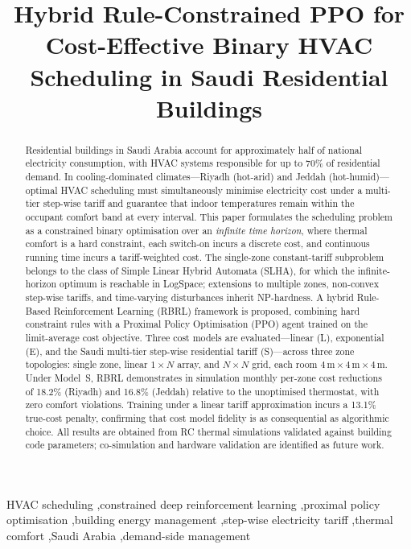 \documentclass[3p,number]{elsarticle}
\begin{document}
 
\begin{frontmatter}
 
\title{Hybrid Rule-Constrained PPO for Cost-Effective Binary HVAC Scheduling in Saudi Residential Buildings}
 
\begin{abstract}
Residential buildings in Saudi Arabia account for approximately half of national electricity consumption, with HVAC systems responsible for up to 70\% of residential demand.
In cooling-dominated climates---Riyadh (hot-arid) and Jeddah (hot-humid)---optimal HVAC scheduling must simultaneously minimise electricity cost under a multi-tier step-wise tariff and guarantee that indoor temperatures remain within the occupant comfort band at every interval.
This paper formulates the scheduling problem as a constrained binary optimisation over an \emph{infinite time horizon}, where thermal comfort is a hard constraint, each switch-on incurs a discrete cost, and continuous running time incurs a tariff-weighted cost.
The single-zone constant-tariff subproblem belongs to the class of Simple Linear Hybrid Automata (SLHA), for which the infinite-horizon optimum is reachable in LogSpace; extensions to multiple zones, non-convex step-wise tariffs, and time-varying disturbances inherit NP-hardness.
A hybrid Rule-Based Reinforcement Learning (RBRL) framework is proposed, combining hard constraint rules with a Proximal Policy Optimisation (PPO) agent trained on the limit-average cost objective.
Three cost models are evaluated---linear (L), exponential (E), and the Saudi multi-tier step-wise residential tariff (S)---across three zone topologies: single zone, linear $1\times N$ array, and $N\times N$ grid, each room $4\,\text{m}\times4\,\text{m}\times4\,\text{m}$.
Under Model~S, RBRL demonstrates in simulation monthly per-zone cost reductions of 18.2\% (Riyadh) and 16.8\% (Jeddah) relative to the unoptimised thermostat, with zero comfort violations.
Training under a linear tariff approximation incurs a 13.1\% true-cost penalty, confirming that cost model fidelity is as consequential as algorithmic choice.
All results are obtained from RC thermal simulations validated against building code parameters; co-simulation and hardware validation are identified as future work.
\end{abstract}
 
\begin{keyword}
HVAC scheduling \sep constrained deep reinforcement learning \sep proximal policy
optimisation \sep building energy management \sep step-wise electricity tariff
\sep thermal comfort \sep Saudi Arabia \sep demand-side management
\end{keyword}
 
\end{frontmatter}
 
\end{document}

